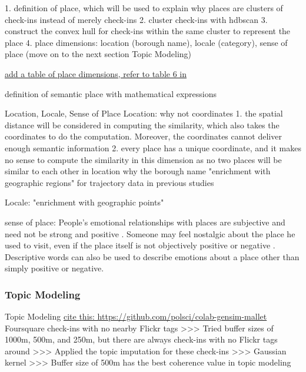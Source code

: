 \documentclass{article}
\begin{document}
1. definition of place, which will be used to explain why places are clusters of check-ins instead of merely check-ins
2. cluster check-ins with hdbscan
3. construct the convex hull for check-ins within the same cluster to represent the place
4. place dimensions: location (borough name), locale (category), sense of place (move on to the next section Topic Modeling)

\underline{add a table of place dimensions, refer to table 6 in \cite{ferrero_mastermovelets_2020}}

definition of semantic place with mathematical expressions

Location, Locale, Sense of Place
Location:
why not coordinates
1. the spatial distance will be considered in computing the similarity, which also takes the coordinates to do the computation. Moreover, the coordinates cannot deliver enough semantic information
2. every place has a unique coordinate, and it makes no sense to compute the similarity in this dimension as no two places will be similar to each other in location
why the borough name
"enrichment with geographic regions" for trajectory data in previous studies \cite{yan_semantic_2013}

Locale:
"enrichment with geographic points" \cite{yan_semantic_2013}



sense of place:
People's emotional relationships with places are subjective and need not be strong and positive \citep{altman_place_1992}. Someone may feel nostalgic about the place he used to visit, even if the place itself is not objectively positive or negative \cite{relph_geographical_1985}. Descriptive words can also be used to describe emotions about a place other than simply positive or negative.

\subsubsection{Topic Modeling}
Topic Modeling
\underline{cite this: https://github.com/polsci/colab-gensim-mallet}
Foursquare check-ins with no nearby Flickr tags >>>
Tried buffer sizes of 1000m, 500m, and 250m, but there are always check-ins with no Flickr tags around >>>
Applied the topic imputation for these check-ins >>>
Gaussian kernel >>>
Buffer size of 500m has the best coherence value in topic modeling
\end{document}
